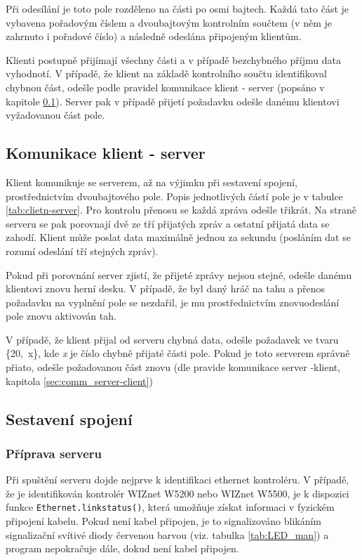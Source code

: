 Při odesílání je toto pole rozděleno na části po osmi bajtech. Každá tato část je vybavena pořadovým číslem a dvoubajtovým kontrolním součtem (v něm je zahrnuto i pořadové číslo) a následně odeslána připojeným klientům.

Klienti postupně přijímají všechny části a v případě bezchybného příjmu data vyhodnotí. V případě, že klient na základě kontrolního součtu identifikoval chybnou část, odešle podle pravidel komunikace klient - server (popsáno v kapitole \ref{sec:comm_client-server}). Server pak v případě přijetí požadavku odešle danému klientovi vyžadovanou část pole.



\subsection{Komunikace klient - server}
\label{sec:comm_client-server}
Klient komunikuje se serverem, až na výjimku při sestavení spojení, prostřednictvím dvoubajtového pole. Popis jednotlivých částí pole je v tabulce \ref{tab:clietn-server}. Pro kontrolu přenosu se každá zpráva odešle třikrát. Na straně serveru se pak porovnají dvě ze tří přijatých zpráv a ostatní přijatá data se zahodí. Klient může poslat data maximálně jednou za sekundu (posláním dat se rozumí odeslání tří stejných zpráv).

Pokud při porovnání server zjistí, že přijeté zprávy nejsou stejné, odešle danému klientovi znovu herní desku. V případě, že byl daný hráč na tahu a přenos požadavku na vyplnění pole se nezdařil, je mu prostřednictvím znovuodeslání pole znovu aktivován tah.

V případě, že klient přijal od serveru chybná data, odešle požadavek ve tvaru \mbox{\{20, x\}}, kde \textit{x} je číslo chybně přijaté části pole. Pokud je toto serverem správně přiato, odešle požadovanou část znovu (dle pravide komunikace server  -klient, kapitola \ref{sec:comm_server-client})




\subsection{Sestavení spojení}
\subsubsection{Příprava serveru}
Při spuštění serveru dojde nejprve k identifikaci ethernet kontroléru. V případě, že je identifikován kontrolér WIZnet W5200 nebo WIZnet W5500, je k dispozici funkce \texttt{Ethernet.linkstatus()}, která umožňuje získat informaci v fyzickém připojení kabelu. Pokud není kabel připojen, je to signalizováno blikáním signalizační svítivé diody červenou barvou (viz. tabulka \ref{tab:LED_man}) a program nepokračuje dále, dokud není kabel připojen.

